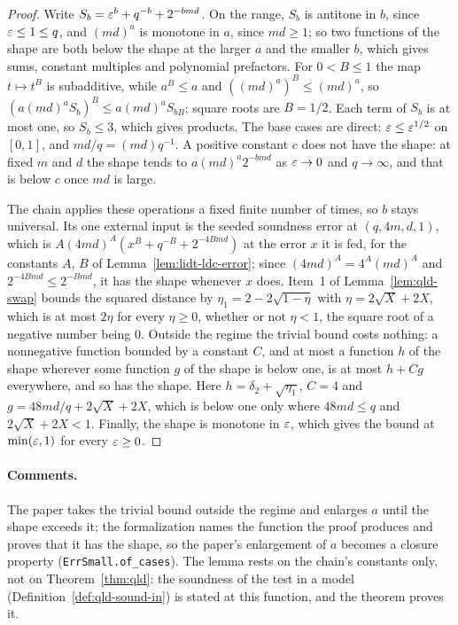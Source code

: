 \begin{proof}
\leanok
Write $S_b = \varepsilon^b + q^{-b} + 2^{-bmd}$. On the range, $S_b$ is antitone in $b$, since
$\varepsilon \leq 1 \leq q$, and $(md)^a$ is monotone in $a$, since $md \geq 1$; so two functions of the
shape are both below the shape at the larger $a$ and the smaller $b$, which gives sums, constant
multiples and polynomial prefactors. For $0 < B \leq 1$ the map $t \mapsto t^B$ is subadditive,
while $a^B \leq a$ and $((md)^a)^B \leq (md)^a$, so $(a (md)^a S_b)^B \leq a (md)^a S_{bB}$; square
roots are $B = 1/2$. Each term of $S_b$ is at most one, so $S_b \leq 3$, which gives products. The
base cases are direct: $\varepsilon \leq \varepsilon^{1/2}$ on $[0, 1]$, and $md/q = (md) q^{-1}$. A positive
constant $c$ does not have the shape: at fixed $m$ and $d$ the shape tends to $a (md)^a 2^{-bmd}$
as $\varepsilon \to 0$ and $q \to \infty$, and that is below $c$ once $md$ is large.

The chain applies these operations a fixed finite number of times, so $b$ stays universal. Its
one external input is the seeded soundness error at $(q, 4m, d, 1)$, which is
$A (4md)^A (x^B + q^{-B} + 2^{-4Bmd})$ at the error $x$ it is fed, for the constants $A$, $B$ of
Lemma~\ref{lem:lidt-ldc-error}; since $(4md)^A = 4^A (md)^A$ and $2^{-4Bmd} \leq 2^{-Bmd}$, it has
the shape whenever $x$ does. Item~1 of Lemma~\ref{lem:qld-swap} bounds the squared distance by
$\eta_1 = 2 - 2\sqrt{1 - \eta}$ with $\eta = 2\sqrt{X} + 2X$, which is at most $2\eta$ for every
$\eta \geq 0$, whether or not $\eta < 1$, the square root of a negative number being $0$. Outside
the regime the trivial bound costs nothing: a nonnegative function bounded by a constant $C$, and
at most a function $h$ of the shape wherever some function $g$ of the shape is below one, is at most
$h + C g$ everywhere, and so has the shape. Here $h = \delta_2 + \sqrt{\eta_1}$, $C = 4$ and
$g = 48md/q + 2\sqrt{X} + 2X$, which is below one only where $48md \leq q$ and
$2\sqrt{X} + 2X < 1$. Finally, the shape is monotone in $\varepsilon$, which gives the bound at
$\min(\varepsilon, 1)$ for every $\varepsilon \geq 0$.
\end{proof}

\paragraph{Comments.} The paper takes the trivial bound outside the regime and enlarges $a$ until
the shape exceeds it; the formalization names the function the proof produces and proves that it
has the shape, so the paper's enlargement of $a$ becomes a closure property
(\texttt{ErrSmall.of\_cases}). The lemma rests on the chain's constants only, not on
Theorem~\ref{thm:qld}: the soundness of the test in a model (Definition~\ref{def:qld-sound-in}) is
stated at this function, and the theorem proves it.

